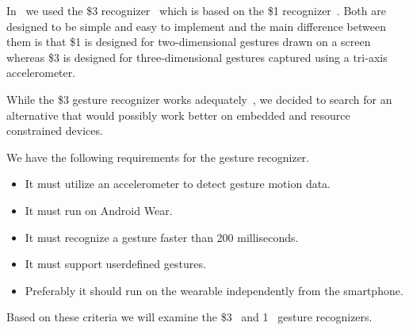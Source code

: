 In~\cite{prespecialisation} we used the \$3 recognizer~\cite{threedollar} which is based on the \$1 recognizer~\cite{wobbrock2007gestures}.
Both are designed to be simple and easy to implement and the main difference between them is that \$1 is designed for two-dimensional gestures drawn on a screen whereas \$3 is designed for three-dimensional gestures captured using a tri-axis accelerometer.

While the \$3 gesture recognizer works adequately~\cite[p. 55]{prespecialisation}, we decided to search for an alternative that would possibly work better on embedded and resource constrained devices.

We have the following requirements for the gesture recognizer.

\begin{itemize}
    \item It must utilize an accelerometer to detect gesture motion data.
    \item It must run on Android Wear.
    \item It must recognize a gesture faster than 200 milliseconds.
    \item It must support userdefined gestures.
    \item Preferably it should run on the wearable independently from the smartphone.
\end{itemize}

\noindent Based on these criteria we will examine the \$3~\cite{threedollar} and 1\textcent~\cite{herold20121} gesture recognizers.





